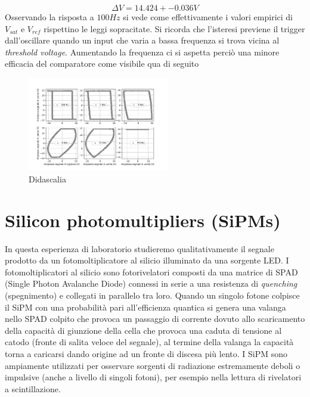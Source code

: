 \documentclass[journal]{IEEEtran}
\begin{document}
\[\Delta V  = 14.424 +- 0.036  V \]
Osservando la risposta a $100 Hz$ si vede come effettivamente i valori empirici di $V_{sat}$ e $V_{ref}$ rispettino le leggi sopracitate.
Si ricorda che l'isteresi previene il trigger dall'oscillare quando un input che varia a bassa frequenza si trova vicina al \textit{threshold voltage}. Aumentando la frequenza ci si aspetta perciò una minore efficacia del comparatore come visibile qua di seguito
\begin{figure}[H]%
\begin {center}
\includegraphics[trim = {50pt 0 0 0}, width=0.55\textwidth]{analysis/output/OPA-trigger-histeresis-table.pdf}
\caption{Didascalia}
\label{fig:hyst-table}
\end {center}
\end{figure}

\section{Silicon photomultipliers (SiPMs)} %
In questa esperienza di laboratorio studieremo qualitativamente il segnale prodotto da un fotomoltiplicatore al silicio illuminato da una sorgente LED. I fotomoltiplicatori al silicio sono fotorivelatori composti da una matrice di SPAD (Single Photon Avalanche Diode) connessi in serie a una resistenza di \textit{quenching} (spegnimento) e collegati in parallelo tra loro. Quando un singolo fotone colpisce il SiPM con una probabilità pari all'efficienza quantica si genera una valanga nello SPAD colpito che provoca un passaggio di corrente dovuto allo scaricamento della capacità di giunzione della cella che provoca una caduta di tensione al catodo (fronte di salita veloce del segnale), al termine della valanga la capacità torna a caricarsi dando origine ad un fronte di discesa più lento. I SiPM sono ampiamente utilizzati per osservare sorgenti di radiazione estremamente deboli o impulsive (anche a livello di singoli fotoni), per esempio nella lettura di rivelatori a scintillazione.
\end{document}
